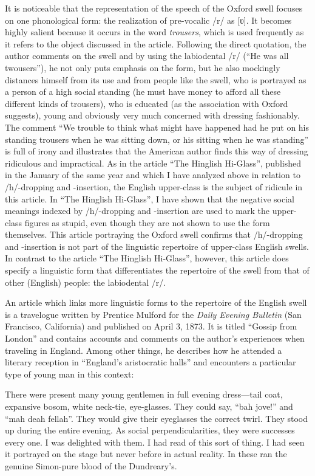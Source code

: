 It is noticeable that the representation of the speech of the Oxford swell focuses on one phonological form: the realization of pre-vocalic /r/ as [ʋ]. It becomes highly salient because it occurs in the word \emph{trousers}, which is used frequently as it refers to the object discussed in the article. Following the direct quotation, the author comments on the swell and by using the labiodental /r/ (“He was all twousers”), he not only puts emphasis on the form, but he also mockingly distances himself from its use and from people like the swell, who is portrayed as a person of a high social standing (he must have money to afford all these different kinds of trousers), who is educated (as the association with Oxford suggests), young and obviously very much concerned with dressing fashionably. The comment “We trouble to think what might have happened had he put on his standing trousers when he was sitting down, or his sitting when he was standing” is full of irony and illustrates that the American author finds this way of dressing ridiculous and impractical. As in the article “The Hinglish Hi-Glass”, published in the January of the same year and which I have analyzed above in relation to /h/-dropping and -insertion, the English upper-class is the subject of ridicule in this article. In “The Hinglish Hi-Glass”, I have shown that the negative social meanings indexed by /h/-dropping and -insertion are used to mark the upper-class figures as stupid, even though they are not shown to use the form themselves. This article portraying the Oxford swell confirms that /h/-dropping and -insertion is not part of the linguistic repertoire of upper-class English swells. In contrast to the article “The Hinglish Hi-Glass”, however, this article does specify a linguistic form that differentiates the repertoire of the swell from that of other (English) people: the labiodental /r/.

An article which links more linguistic forms to the repertoire of the English swell is a travelogue written by Prentice Mulford for the \emph{Daily Evening Bulletin} (San Francisco, California) and published on April 3, 1873. It is titled “Gossip from London” and contains accounts and comments on the author’s experiences when traveling in England. Among other things, he describes how he attended a literary reception in “England’s aristocratic halls” and encounters a particular type of young man in this context:

\begin{ipquote}
There were present many young gentlemen in full evening dress—tail coat, expansive bosom, white neck-tie, eye-glasses. They could say, “bah jove!” and “mah deah fellah”. They would give their eyeglasses the correct twirl. They stood up during the entire evening. As social perpendicularities, they were successes every one. I was delighted with them. I had read of this sort of thing. I had seen it portrayed on the stage but never before in actual reality. In these ran the genuine Simon-pure blood of the Dundreary’s.
\end{ipquote}


